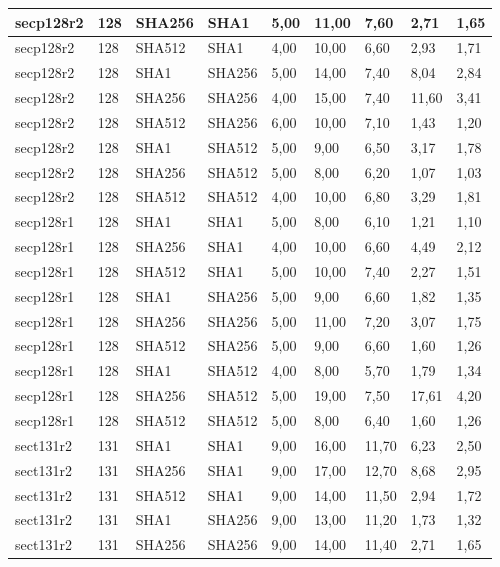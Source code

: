 \begin{longtable}{| l | l | l | l | l |l |l |l |l |}
secp128r2 & 128 & SHA256 & SHA1 & 5,00 & 11,00 & 7,60 & 2,71 & 1,65 \\ \hline 
secp128r2 & 128 & SHA512 & SHA1 & 4,00 & 10,00 & 6,60 & 2,93 & 1,71 \\ \hline 
secp128r2 & 128 & SHA1 & SHA256 & 5,00 & 14,00 & 7,40 & 8,04 & 2,84 \\ \hline 
secp128r2 & 128 & SHA256 & SHA256 & 4,00 & 15,00 & 7,40 & 11,60 & 3,41 \\ \hline 
secp128r2 & 128 & SHA512 & SHA256 & 6,00 & 10,00 & 7,10 & 1,43 & 1,20 \\ \hline 
secp128r2 & 128 & SHA1 & SHA512 & 5,00 & 9,00 & 6,50 & 3,17 & 1,78 \\ \hline 
secp128r2 & 128 & SHA256 & SHA512 & 5,00 & 8,00 & 6,20 & 1,07 & 1,03 \\ \hline 
secp128r2 & 128 & SHA512 & SHA512 & 4,00 & 10,00 & 6,80 & 3,29 & 1,81 \\ \hline 
secp128r1 & 128 & SHA1 & SHA1 & 5,00 & 8,00 & 6,10 & 1,21 & 1,10 \\ \hline 
secp128r1 & 128 & SHA256 & SHA1 & 4,00 & 10,00 & 6,60 & 4,49 & 2,12 \\ \hline 
secp128r1 & 128 & SHA512 & SHA1 & 5,00 & 10,00 & 7,40 & 2,27 & 1,51 \\ \hline 
secp128r1 & 128 & SHA1 & SHA256 & 5,00 & 9,00 & 6,60 & 1,82 & 1,35 \\ \hline 
secp128r1 & 128 & SHA256 & SHA256 & 5,00 & 11,00 & 7,20 & 3,07 & 1,75 \\ \hline 
secp128r1 & 128 & SHA512 & SHA256 & 5,00 & 9,00 & 6,60 & 1,60 & 1,26 \\ \hline 
secp128r1 & 128 & SHA1 & SHA512 & 4,00 & 8,00 & 5,70 & 1,79 & 1,34 \\ \hline 
secp128r1 & 128 & SHA256 & SHA512 & 5,00 & 19,00 & 7,50 & 17,61 & 4,20 \\ \hline 
secp128r1 & 128 & SHA512 & SHA512 & 5,00 & 8,00 & 6,40 & 1,60 & 1,26 \\ \hline 
sect131r2 & 131 & SHA1 & SHA1 & 9,00 & 16,00 & 11,70 & 6,23 & 2,50 \\ \hline 
sect131r2 & 131 & SHA256 & SHA1 & 9,00 & 17,00 & 12,70 & 8,68 & 2,95 \\ \hline 
sect131r2 & 131 & SHA512 & SHA1 & 9,00 & 14,00 & 11,50 & 2,94 & 1,72 \\ \hline 
sect131r2 & 131 & SHA1 & SHA256 & 9,00 & 13,00 & 11,20 & 1,73 & 1,32 \\ \hline 
sect131r2 & 131 & SHA256 & SHA256 & 9,00 & 14,00 & 11,40 & 2,71 & 1,65 \\ \hline 

\end{longtable}
